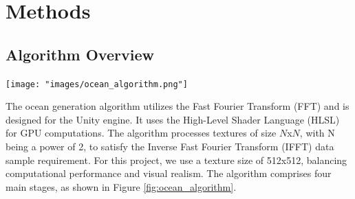 \chapter{Methods}
\label{chapter2}
\justifying


\section{Algorithm Overview}

\begin{minipage}{1\textwidth}
    \centering
    \texttt{[image: "images/ocean\_algorithm.png"]}
    \label{fig:ocean_algorithm}
\end{minipage}
\vspace{0.0cm}

The ocean generation algorithm utilizes the Fast Fourier Transform (FFT) and is designed for the Unity engine. It uses the High-Level Shader Language (HLSL) for GPU computations. The algorithm processes textures of size $N$x$N$, with N being a power of 2, to satisfy the Inverse Fast Fourier Transform (IFFT) data sample requirement. For this project, we use a texture size of 512x512, balancing computational performance and visual realism. The algorithm comprises four main stages, as shown in Figure \ref{fig:ocean_algorithm}.

